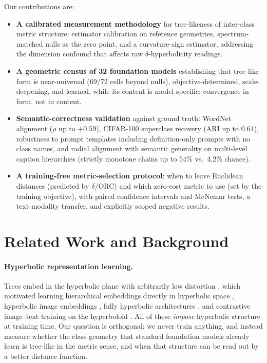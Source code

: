 \documentclass{article} %
\begin{document}
Our contributions are:
\begin{itemize}
\item \textbf{A calibrated measurement methodology} for tree-likeness of inter-class metric structure: estimator calibration on reference geometries, spectrum-matched nulls as the zero point, and a curvature-sign estimator, addressing the dimension confound that affects raw $\delta$-hyperbolicity readings.
\item \textbf{A geometric census of 32 foundation models} establishing that tree-like form is near-universal (69/72 cells beyond nulls), objective-determined, scale-deepening, and learned, while its content is model-specific: convergence in form, not in content.
\item \textbf{Semantic-correctness validation} against ground truth: WordNet alignment ($\rho$ up to $+0.59$), CIFAR-100 superclass recovery (ARI up to $0.61$), robustness to prompt templates including definition-only prompts with no class names, and radial alignment with semantic generality on multi-level caption hierarchies (strictly monotone chains up to $54\%$ vs.\ $4.2\%$ chance). %
\item \textbf{A training-free metric-selection protocol}: when to leave Euclidean distances (predicted by $\delta$/ORC) and which zero-cost metric to use (set by the training objective), with paired confidence intervals and McNemar tests, a text-modality transfer, and explicitly scoped negative results.
\end{itemize}

\section{Related Work and Background}
\label{sec:related}

\paragraph{Hyperbolic representation learning.} Trees embed in the hyperbolic plane with arbitrarily low distortion \citep{sarkar2011low}, which motivated learning hierarchical embeddings directly in hyperbolic space \citep{nickel2017poincare}, hyperbolic image embeddings \citep{Khrulkov_2020_CVPR}, fully hyperbolic architectures \citep{chen2022fully}, and contrastive image--text training on the hyperboloid \citep{desai2023meru}. All of these \emph{impose} hyperbolic structure at training time. Our question is orthogonal: we never train anything, and instead measure whether the class geometry that standard foundation models already learn is tree-like in the metric sense, and when that structure can be read out by a better distance function.
\end{document}

